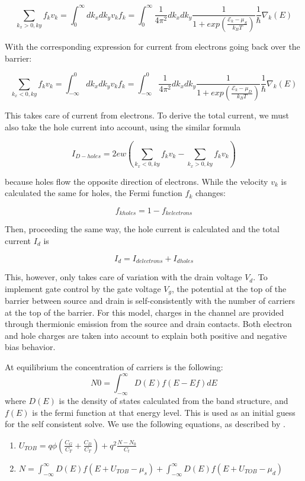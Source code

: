 \documentclass[11pt]{article}
\begin{document}
$$\sum_{k_x>0, ky}f_{k}v_{k} =\int_{0}^{\infty}dk_xdk_yv_{k}f_{k} = \int_{0}^{\infty}\frac{1}{4\pi^2}dk_xdk_y\frac{1}{1+exp(\frac{\mathcal{E}_{k} - \mu_S}{k_BT})}\frac{1}{\hbar}\nabla_k(E)$$

With the corresponding expression for current from electrons going back over the barrier:

$$\sum_{k_x<0, ky}f_{k}v_{k} =\int_{-\infty}^{0}dk_xdk_yv_{k}f_{k} = \int_{-\infty}^{0}\frac{1}{4\pi^2}dk_xdk_y\frac{1}{1+exp(\frac{\mathcal{E}_{k} - \mu_D}{k_BT})}\frac{1}{\hbar}\nabla_k(E)$$

This takes care of current from electrons. To derive the total current, we must also take the hole current into account, using the similar formula

$$I_{D-holes} = 2ew(\sum_{k_x<0, ky}f_{k}v_{k} - \sum_{k_x>0, ky}f_{k}v_{k})$$

because holes flow the opposite direction of electrons. While the velocity $v_k$ is calculated the same for holes, the Fermi function $f_k$ changes:

$$f_{kholes}=1-f_{kelectrons}$$

Then, proceeding the same way, the hole current is calculated and the total current $I_d$ is

$$I_d = I_{delectrons}+I_{dholes}$$


This, however, only takes care of variation with the drain voltage $V_d$. To implement gate control by the gate voltage $V_g$, the potential at the top of the barrier between source and drain is self-consistently with the number of carriers at the top of the barrier. For this model, charges in the channel are provided through thermionic emission from the source and drain contacts. Both electron and hole charges are taken into account to explain both positive and negative bias behavior. 

At equilibrium the concentration of carriers is the following:
$$N0 = \int_{-\infty}^{\infty}{D(E)f(E-Ef)dE}$$
where $D(E)$ is the density of states calculated from the band structure, and $f(E)$ is the fermi function at that energy level. This is used as an initial guess for the self consistent solve. We use the following equations, as described by \cite{ballistic2002}. 

\begin{enumerate}
\item $U_{TOB} = q\phi(\frac{C_G}{C_T} + \frac{C_D}{C_T}) + q^2\frac{N-N_0}{C_t}$ 
\item $N = \int_{-\infty}^{\infty}{D(E)f(E+U_{TOB}-\mu_s)} + \int_{-\infty}^{\infty}{D(E)f(E+U_{TOB}-\mu_d)}$
\end{enumerate}
\end{document}
